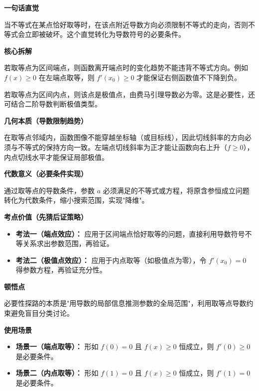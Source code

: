 \begin{explanationbox}
	\textbf{\textcolor{CExplanation}{一句话直觉}}

	当不等式在某点恰好取等时，在该点附近导数方向必须限制不等式的走向，否则不等式会立即被破坏。这个直觉转化为导数符号的必要条件。

	\medskip
	\textbf{\textcolor{CExplanation}{核心拆解}}
	\begin{description}[style=nextline, leftmargin=2.8em, labelsep=0.5em, itemsep=0.45em]
		\item[\textbf{要点一（端点导数限制）：}] 若取等点为区间端点，则函数离开端点时的变化趋势不能违背不等式方向。例如 $f(x)\ge 0$ 在左端点取等，则 $f'(x_0)\ge 0$ 才能保证右侧函数值不下降到负。
		\item[\textbf{要点二（内点导数归零）：}] 若取等点为区间内点，则该点是极值点，由费马引理导数必为零。这是必要性，还可结合二阶导数判断极值类型。
	\end{description}

	\medskip
	\textbf{\textcolor{CExplanation}{几何本质（导数限制趋势）}}

	在取等点邻域内，函数图像不能穿越坐标轴（或目标线），因此切线斜率的方向必须与不等式的保持方向一致。左端点切线斜率为正才能让函数向右上升（$f\ge0$），内点切线水平才能保证局部极值。

	\medskip
	\textbf{\textcolor{CExplanation}{代数意义（必要条件实现）}}

	通过取等点的导数条件，参数 $a$ 必须满足的不等式或方程，将原含参恒成立问题转化为代数条件，缩小搜索范围，实现"降维"。

	\medskip
	\textbf{\textcolor{CExplanation}{考点价值（先猜后证策略）}}
	\begin{itemize}[leftmargin=*, itemsep=0.5em, topsep=0.4em]
		\item \textbf{考法一（端点效应）：} 应用于区间端点恰好取等的问题，直接利用导数符号不等关系求出参数范围，再验证。
		\item \textbf{考法二（极值点效应）：} 应用于内点取等（如极值点为零），令 $f'(x_0)=0$ 得参数方程，再验证充分性。
	\end{itemize}

	\medskip
	\textbf{\textcolor{CExplanation}{顿悟点}}

	必要性探路的本质是"用导数的局部信息推测参数的全局范围"，利用取等点导数约束避免盲目分类讨论。

	\medskip
	\textbf{\textcolor{CExplanation}{使用场景}}
	\begin{itemize}[leftmargin=*, itemsep=0.5em, topsep=0.4em]
		\item \textbf{场景一（端点取等）：} 形如 $f(0)=0$ 且 $f(x)\ge 0$ 恒成立，则 $f'(0)\ge 0$ 是必要条件。
		\item \textbf{场景二（内点取等）：} 形如 $f(1)=0$ 且 $f(x)\ge 0$ 恒成立，则 $f'(1)=0$ 是必要条件。
	\end{itemize}
\end{explanationbox}
